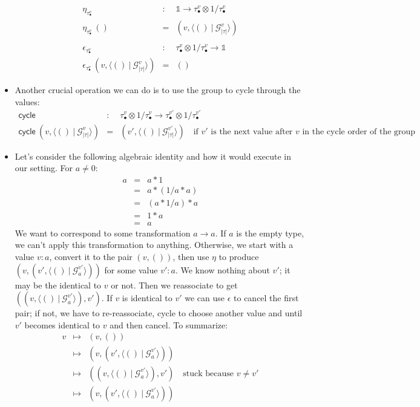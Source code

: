 \documentclass{article}
\newcommand{\ot}{\mathbb{1}}
\newcommand{\G}{\mathcal{G}}
\newcommand{\fv}[2]{\langle #1 ~|~ #2 \rangle}
\newcommand{\pt}[2]{#1_{\bullet}^{#2}}
\newcommand{\cycle}{\textsf{cycle}}
\begin{document}
\begin{itemize}
\[\begin{array}{rcl}
\eta_{\pt{\tau}{v}} &:& \ot \rightarrow \pt{\tau}{v} \otimes 1/\pt{\tau}{v} \\
\eta_{\pt{\tau}{v}}~() &=& (v , \fv{()}{\G^v_{|\tau|}}) \\
\\
\epsilon_{\pt{\tau}{v}} &:& \pt{\tau}{v} \otimes 1/\pt{\tau}{v} \rightarrow \ot \\
\epsilon_{\pt{\tau}{v}}~(v , \fv{()}{\G^v_{|\tau|}}) &=& () 
\end{array}\]
\item Another crucial operation we can do is to use the group to cycle through the values:
\[\begin{array}{rcl}
\cycle &:& \pt{\tau}{v} \otimes 1/\pt{\tau}{v} \rightarrow \pt{\tau}{v'} \otimes 1/\pt{\tau}{v'} \\
\cycle~(v, \fv{()}{\G^v_{|\tau|}}) &=& (v', \fv{()}{\G^{v'}_{|\tau|}})
  \quad \mbox{if~$v'$~is~the~next~value~after~$v$~in~the~cycle~order~of~the~group}
\end{array}\]
\item Let's consider the following algebraic identity and how it would execute in our setting. For $a \neq 0$:
\[\begin{array}{rcl}
a &=& a * 1 \\
&=& a * (1/a * a) \\
&=& (a * 1/a) * a \\
&=& 1 * a \\
&=& a
\end{array}\]
We want to correspond to some transformation $a \rightarrow a$. If $a$ is the empty type, we can't apply this transformation to anything. Otherwise, we start with a value $v : a$, convert it to the pair $(v, ())$, then use $\eta$ to produce $(v , (v' , \fv{()}{\G_a^{v'}}))$ for some value $v' : a$. We know nothing about $v'$; it may be the identical to $v$ or not. Then we reassociate to get $((v , \fv{()}{\G_a^{v'}}), v')$. If $v$ is identical to $v'$ we can use $\epsilon$ to cancel the first pair; if not, we have to re-reassociate, cycle to choose another value and until $v'$ becomes identical to $v$ and then cancel. To summarize:
\[\begin{array}{rcl}
v &\mapsto& (v , ()) \\
&\mapsto& (v , (v' , \fv{()}{\G_a^{v'}})) \\
&\mapsto& ((v , \fv{()}{\G_a^{v'}}), v')  \quad \mbox{stuck~because~} v \neq v' \\
&\mapsto& (v , (v' , \fv{()}{\G_a^{v'}})) \\

\end{array}\]
\end{itemize}
\end{document}
